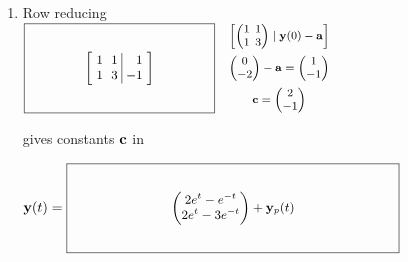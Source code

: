 \documentclass[12pt,letterpaper]{article}
\newcommand{\KeyBox}[3]{\vcenter{\hbox{$\boxed{\parbox[c][#2][c]{#1}{\centering\small\setlength{\arraycolsep}{3pt}\ensuremath{\displaystyle #3}}}$}}}
\newcommand{\KeySide}[2]{\quad\vcenter{\hbox{\parbox{#1}{\footnotesize\setlength{\arraycolsep}{2pt}\ensuremath{\begin{gathered}#2\end{gathered}}}}}}
\begin{document}
\begin{enumerate}
\begin{enumerate}
\item Row reducing
$\KeyBox{1.8in}{0.80in}{\left[\begin{array}{rr|r}1&1&1\\1&3&-1\end{array}\right]}\KeySide{2.8in}{\left[\begin{pmatrix}1&1\\1&3\end{pmatrix}\mid\vect{y}(0)-\vect{a}\right]\\\begin{pmatrix}0\\-2\end{pmatrix}-\vect{a}=\begin{pmatrix}1\\-1\end{pmatrix}\\\vect{c}=\begin{pmatrix}2\\-1\end{pmatrix}}$
\par
gives constants $\mathbf{c}$ in
\par
$\vect{y}(t)=\KeyBox{3.2in}{0.80in}{\begin{pmatrix}2e^t-e^{-t}\\2e^t-3e^{-t}\end{pmatrix}+\vect{y}_p(t)}$
\end{enumerate}
\end{enumerate}
\end{document}
